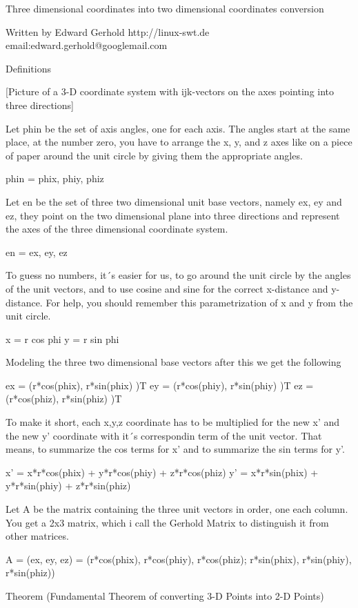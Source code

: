 Three dimensional coordinates into two dimensional coordinates conversion

Written by Edward Gerhold
http://linux-swt.de
email:edward.gerhold@googlemail.com

Definitions

[Picture of a 3-D coordinate system with ijk-vectors on the axes pointing
into three directions]

Let phin be the set of axis angles, one for each axis. The angles start
at the same place, at the number zero, you have to arrange the x, y, and
z axes like on a piece of paper around the unit circle by giving them the
appropriate angles.

phin = { phix, phiy, phiz }

Let en be the set of three two dimensional unit base vectors, namely ex,
ey and ez, they point on the two dimensional plane into three directions
and represent the axes of the three dimensional coordinate system.

en = { ex, ey, ez }

To guess no numbers, it´s easier for us, to go around the unit circle by
the angles of the unit vectors, and to use cosine and sine for the correct
x-distance and y-distance. For help, you should remember this parametrization
of x and y from the unit circle.

x = r cos phi
y = r sin phi

Modeling the three two dimensional base vectors after this we get the following

ex = (r*cos(phix), r*sin(phix) )T
ey = (r*cos(phiy), r*sin(phiy) )T
ez = (r*cos(phiz), r*sin(phiz) )T

To make it short, each x,y,z coordinate has to be multiplied for the new x' and
the new y' coordinate with it´s correspondin term of the unit vector. That means,
to summarize the cos terms for x' and to summarize the sin terms for y'.

x' = x*r*cos(phix) + y*r*cos(phiy) + z*r*cos(phiz)
y' = x*r*sin(phix) + y*r*sin(phiy) + z*r*sin(phiz)

Let A be the matrix containing the three unit vectors in order, one each
column. You get a 2x3 matrix, which i call the Gerhold Matrix to distinguish 
it from other matrices. 

A = (ex, ey, ez) 
  = (r*cos(phix), r*cos(phiy), r*cos(phiz);
     r*sin(phix), r*sin(phiy), r*sin(phiz))

Theorem (Fundamental Theorem of converting 3-D Points into 2-D Points)

